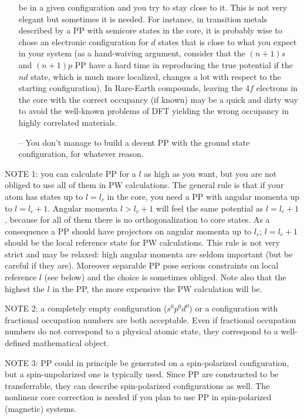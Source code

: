 \documentclass[12pt,a4paper]{article}
\begin{document}
\begin{enumerate}
   be in a given configuration and you try to stay close to it.
   This is not very elegant but sometimes it is needed. For instance,
   in transition metals described by a PP with semicore states in the 
   core, it is probably wise to chose an electronic configuration for 
   $d$ states that is close to what you expect in your system (as a
   hand-waiving argument, consider that the $(n+1)s$ and $(n+1)p$ PP 
   have a hard time in reproducing the true potential if the $nd$ state,
   which is much more localized, changes a lot with respect to the
   starting configuration). In Rare-Earth compounds, leaving the $4f$ 
   electrons in the core with the correct occupancy (if known) may be 
   a quick and dirty way to avoid the well-known problems of DFT yielding 
   the wrong occupancy in highly correlated materials.
\item[--]
   You don't manage to build a decent PP with the ground state configuration, 
   for whatever reason.
\end{enumerate}

NOTE 1: you can calculate PP for a $l$ as high as you want, but you
are not obliged to use all of them in PW calculations. The general
rule is that if your atom has states up to $l=l_c$ in the core, you
need a PP with angular momenta up to $l=l_c+1$. Angular momenta
$l>l_c+1$ will feel the same potential as $l=l_c+1$, because
for all of them there is no orthogonalization to core states.
As a consequence a PP should have projectors on angular momenta up to
$l_c$; $l=l_c+1$ should be the local reference state for PW
calculations. This rule is not very strict and may be relaxed: high
angular momenta are seldom important (but be careful if they are). 
Moreover separable PP pose serious constraints on local reference $l$
(see below) and the choice is sometimes obliged. Note also that the
highest the $l$ in the PP, the more expensive the PW calculation will 
be.

NOTE 2: a completely empty configuration ($s^0p^0d^0$) or
a configuration with fractional occupation numbers are both
acceptable. Even if fractional occupation numbers do
not correspond to a physical atomic state, they correspond to a
well-defined mathematical object.

NOTE 3: PP could in principle be generated on a spin-polarized
configuration, but a spin-unpolarized one is typically used.
Since PP are constructed to be transferrable, they can describe
spin-polarized configurations as well. The nonlinear core correction
is needed if you plan to use PP in spin-polarized (magnetic)
systems.
\end{document}

